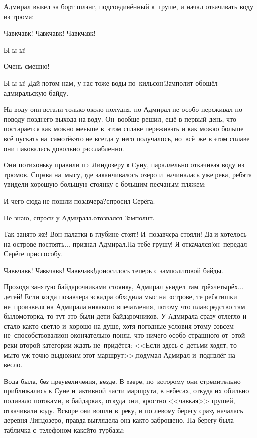 Адмирал вывел за борт шланг, подсоединённый к~груше, и начал откачивать воду из трюма:

\diagdash Чавк\sdash чавк! Чавк\sdash чавк! Чавк\sdash чавк!

\diagdash Ы-ы-ы!

\diagdash Очень смешно!

\diagdash Ы-ы-ы! Дай потом нам, у нас тоже воды по~кильсон!\mdash Замполит обошёл адмиральскую байду.

На воду они встали только около полудня, но Адмирал не особо переживал по поводу позднего выхода на воду. Он~вообще решил, ещё в первый день, что постарается как можно меньше в~этом сплаве переживать и как можно больше всё пускать на~самотёк\mdash это не всегда у него получалось, но~всё~же в этом сплаве они паковались довольно расслабленно.

Они потихоньку правили по~Линдозеру в Суну, параллельно откачивая воду из трюмов. Справа на~мысу, где заканчивалось озеро и~начиналась уже река, ребята увидели хорошую большую стоянку с большим песчаным пляжем:

\diagdash И чего сюда не пошли позавчера?\mdash спросил Серёга.

\diagdash Не знаю, спроси у Адмирала.\mdash отозвался Замполит.

\diagdash Так занято же! Вон палатки в глубине стоят! И~позавчера стояли! Да и хотелось на острове постоять$\ldots$ \mdash признал Адмирал.\mdash На тебе грушу! Я откачался!\mdash он~передал Серёге приспособу.

\diagdash Чавк\sdash чавк! Чавк\sdash чавк! Чавк\sdash чавк!\mdash доносилось теперь с замполитовой байды.

Проходя занятую байдарочниками стоянку, Адмирал увидел там трёх\sdash четырёх$\ldots$ детей! Если когда позавчера эскадра обходила мыс на~острове, те ребятишки не~произвели на Адмирала никакого впечатления, потому что плавсредство там было\mdash моторка, то тут это были дети байдарочников. У Адмирала сразу отлегло и стало как\sdash то светло и~хорошо на душе, хотя погодные условия этому совсем не~способствовали\mdash он окончательно понял, что ничего особо страшного от~этой реки второй категории ждать не~придётся: <<Если здесь с~детьми ходят, то мы\sdash то уж точно выдюжим этот маршрут>>,\mdash подумал Адмирал и~подналёг на весло.

Вода была, без преувеличения, везде. В озере, по~которому они стремительно приближались к Суне и~активной части маршрута, в небесах, откуда их обильно поливало потоками, в байдарках, откуда они, яростно <<чавкая>> грушей, откачивали воду. Вскоре они вошли в~реку, и по левому берегу сразу началась деревня Линдозеро, правда выглядела она как\sdash то заброшено. На берегу была табличка с~телефоном какой\sdash то турбазы:

